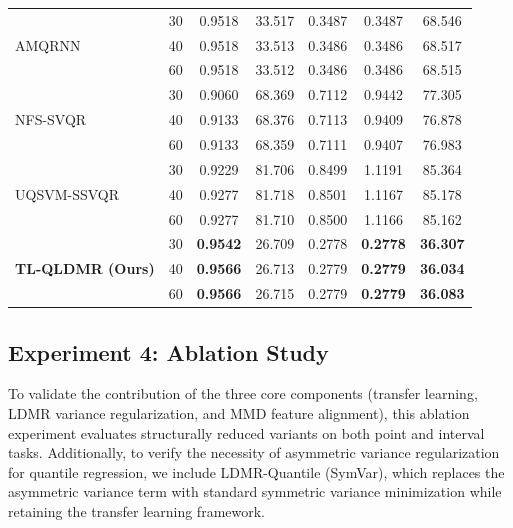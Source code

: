 \begin{table}[ht]
\begin{tabular}{llccccc}
\multirow{3}{*}{AMQRNN}
  & 30 & 0.9518 & 33.517 & 0.3487 & 0.3487 & 68.546 \\
  & 40 & 0.9518 & 33.513 & 0.3486 & 0.3486 & 68.517 \\
  & 60 & 0.9518 & 33.512 & 0.3486 & 0.3486 & 68.515 \\
\multirow{3}{*}{NFS-SVQR}
  & 30 & 0.9060 & 68.369 & 0.7112 & 0.9442 & 77.305 \\
  & 40 & 0.9133 & 68.376 & 0.7113 & 0.9409 & 76.878 \\
  & 60 & 0.9133 & 68.359 & 0.7111 & 0.9407 & 76.983 \\
\multirow{3}{*}{UQSVM-SSVQR}
  & 30 & 0.9229 & 81.706 & 0.8499 & 1.1191 & 85.364 \\
  & 40 & 0.9277 & 81.718 & 0.8501 & 1.1167 & 85.178 \\
  & 60 & 0.9277 & 81.710 & 0.8500 & 1.1166 & 85.162 \\
\multirow{3}{*}{\textbf{TL-QLDMR (Ours)}}
  & 30 & \textbf{0.9542} & 26.709 & 0.2778 & \textbf{0.2778} & \textbf{36.307} \\
  & 40 & \textbf{0.9566} & 26.713 & 0.2779 & \textbf{0.2779} & \textbf{36.034} \\
  & 60 & \textbf{0.9566} & 26.715 & 0.2779 & \textbf{0.2779} & \textbf{36.083} \\
\bottomrule
\end{tabular}
\label{tab:exp3_noise}
\end{table}



\subsection{Experiment 4: Ablation Study}\label{sec:exp4}

To validate the contribution of the three core components (transfer learning, LDMR variance regularization, and MMD feature alignment), this ablation experiment evaluates structurally reduced variants on both point and interval tasks. Additionally, to verify the necessity of asymmetric variance regularization for quantile regression, we include LDMR-Quantile (SymVar), which replaces the asymmetric variance term with standard symmetric variance minimization while retaining the transfer learning framework.

